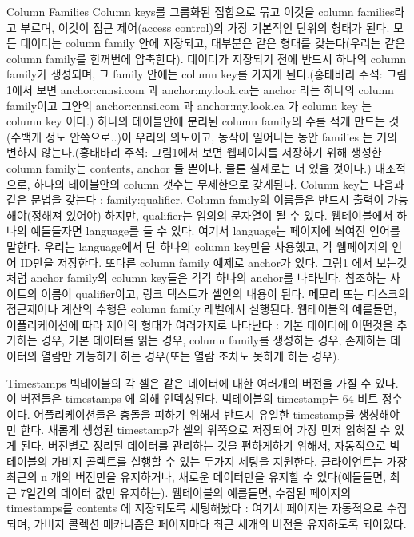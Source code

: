 \documentclass[twocolumn]{article}
\begin{document}
Column Families
 Column keys를 그룹화된 집합으로 묶고 이것을 column families라고 부르며, 이것이 접근 제어(access control)의 가장 기본적인 단위의 형태가 된다. 모든 데이터는 column family 안에 저장되고, 대부분은 같은 형태를 갖는다(우리는 같은 column family를 한꺼번에 압축한다). 데이터가 저장되기 전에 반드시 하나의 column family가 생성되며, 그 family 안에는 column key를 가지게 된다.(홍태바리 주석: 그림1에서 보면 anchor:cnnsi.com 과 anchor:my.look.ca는 anchor 라는 하나의 column family이고 그안의 anchor:cnnsi.com 과 anchor:my.look.ca 가 column key 는 column key 이다.)
하나의 테이블안에 분리된 column family의 수를 적게 만드는 것(수백개 정도 안쪽으로..)이 우리의 의도이고, 동작이 일어나는 동안 families 는 거의 변하지 않는다.(홍태바리 주석: 그림1에서 보면 웹페이지를 저장하기 위해 생성한 column family는 contents, anchor 둘 뿐이다. 물론 실제로는 더 있을 것이다.) 대조적으로, 하나의 테이블안의 column 갯수는 무제한으로 갖게된다.
Column key는 다음과 같은 문법을 갖는다 :
 family:qualifier. Column family의 이름들은 반드시 출력이 가능해야(정해져 있어야) 하지만, qualifier는 임의의 문자열이 될 수 있다. 웹테이블에서 하나의 예들들자면 language를 들 수 있다. 여기서 language는 페이지에 씌여진 언어를 말한다. 우리는 language에서 단 하나의 column key만을 사용했고, 각 웹페이지의 언어 ID만을 저장한다. 또다른 column family 예제로 anchor가 있다. 그림1 에서 보는것처럼 anchor family의 column key들은 각각 하나의 anchor를 나타낸다. 참조하는 사이트의 이름이 qualifier이고, 링크 텍스트가 셀안의 내용이 된다.
 메모리 또는 디스크의 접근제어나 계산의 수행은 column family 레벨에서 실행된다. 웹테이블의 예를들면, 어플리케이션에 따라 제어의 형태가 여러가지로 나타난다 : 기본 데이터에 어떤것을 추가하는 경우, 기본 데이터를 읽는 경우, column family를 생성하는 경우, 존재하는 데이터의 열람만 가능하게 하는 경우(또는 열람 조차도 못하게 하는 경우).
 
Timestamps
 빅테이블의 각 셀은 같은 데이터에 대한 여러개의 버전을 가질 수 있다. 이 버전들은 timestamps 에 의해 인덱싱된다. 빅테이블의 timestamp는 64 비트 정수이다.
 어플리케이션들은 충돌을 피하기 위해서 반드시 유일한 timestamp를 생성해야만 한다. 새롭게 생성된 timestamp가 셀의 위쪽으로 저장되어 가장 먼저 읽혀질 수 있게 된다. 버전별로 정리된 데이터를 관리하는 것을 편하게하기 위해서, 자동적으로 빅테이블의 가비지 콜렉트를 실행할 수 있는 두가지 세팅을 지원한다. 클라이언트는 가장 최근의 n 개의 버전만을 유지하거나, 새로운 데이터만을 유지할 수 있다(예들들면, 최근 7일간의 데이터 값만 유지하는).
웹테이블의 예를들면, 수집된 페이지의 timestamps를 contents 에 저장되도록 세팅해놨다 : 여기서 페이지는 자동적으로 수집되며, 가비지 콜렉션 메카니즘은 페이지마다 최근 세개의 버전을 유지하도록 되어있다.
 
\end{document}
